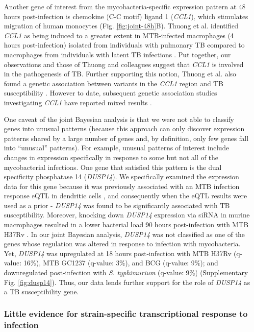 Another gene of interest from the mycobacteria-specific expression
pattern at 48 hours post-infection is chemokine (C-C motif) ligand 1
(\emph{CCL1}), which stimulates migration of human monocytes
\citep{Miller1992} (Fig. \ref{fig:joint-48h}B). Thuong et al. identified \emph{CCL1} as
being induced to a greater extent in MTB-infected macrophages (4 hours
post-infection) isolated from individuals with pulmonary TB compared to
macrophages from individuals with latent TB infections
\citep{Thuong2008}. Put together, our observations and those of Thuong
and colleagues suggest that \emph{CCL1} is involved in the pathogenesis
of TB. Further supporting this notion, Thuong et al. also found a
genetic association between variants in the \emph{CCL1} region and TB
susceptibility \citep{Thuong2008}. However to date, subsequent genetic
association studies investigating \emph{CCL1} have reported mixed
results \citep{Tang2011, Ozdemir2013}.

One caveat of the joint Bayesian analysis is that we were not able to
classify genes into unusual patterns (because this approach can only
discover expression patterns shared by a large number of genes and, by
definition, only few genes fall into ``unusual'' patterns). For example,
unusual patterns of interest include changes in expression specifically
in response to some but not all of the mycobacterial infections. One
gene that satisfied this pattern is the dual specificity phosphatase 14
(\emph{DUSP14}). We specifically examined the expression data for this
gene because it was previously associated with an MTB infection response
eQTL in dendritic cells \citep{Barreiro2012}, and consequently when the
eQTL results were used as a prior - \emph{DUSP14} was found to be
significantly associated with TB susceptibility. Moreover, knocking down
\emph{DUSP14} expression via siRNA in murine macrophages resulted in a
lower bacterial load 90 hours post-infection with MTB H37Rv
\citep{Jayaswal2010}. In our joint Bayesian analysis, \emph{DUSP14} was
not classified as one of the genes whose regulation was altered in
response to infection with mycobacteria. Yet, \emph{DUSP14} was
upregulated at 18 hours post-infection with MTB H37Rv (q-value: 16\%),
MTB GC1237 (q-value: 3\%), and BCG (q-value: 9\%); and downregulated
post-infection with \emph{S. typhimurium} (q-value: 9\%) (Supplementary
Fig. \ref{fig:dusp14}). Thus, our data lends further support for the role of
\emph{DUSP14} as a TB susceptibility gene.

\subsubsection{Little evidence for strain-specific transcriptional
response to
infection}\label{little-evidence-for-strain-specific-transcriptional-response-to-infection}

